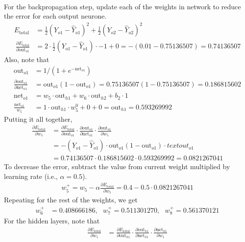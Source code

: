 \begin{example}
\begin{align}
\end{align}
For the backpropagation step, update each of the weights in network to reduce the error for each output neurone.
\begin{align}
E_{\text{total}} &= \frac{1}{2}(Y_{o1} - \hat{Y}_{o1})^2 + \frac{1}{2}(Y_{o2} - \hat{Y}_{o2})^2 \nonumber \\\
\frac{\partial E_{\text{total}}}{\partial \text{out}_{o1}} &= 2 \cdot \frac{1}{2}(Y_{o1} - \hat{Y}_{o1}) \cdot -1 + 0 = - (0.01 - 0.75136507) = 0.74136507 \nonumber
\end{align}
Also, note that
\begin{align}
\text{out}_{o1} &= 1/(1 + e^{-\text{net}_{o1}}) \nonumber \\
\frac{\partial\text{out}_{o1}}{\partial\text{net}_{o1}} &= \text{out}_{o1} (1 - \text{out}_{o1}) = 0.75136507(1-0.75136507) = 0.186815602 \nonumber \\
\text{net}_{o1} &= w_5 \cdot \text{out}_{h1} + w_6 \cdot \text{out}_{h2} + b_2 \cdot 1 \nonumber \\
\frac{\text{net}_{o1}}{w_5} &= 1 \cdot \text{out}_{h1} \cdot w_5^{0} + 0 + 0 = \text{out}_{h1} = 0.593269992 \nonumber
\end{align}
Putting it all together,
\begin{align}
\frac{\partial E_{\text{total}}}{\partial w_5} &= \frac{\partial E_{\text{total}}}{\partial \text{out}_{o1}} \cdot \frac{\partial \text{out}_{o1}}{ \partial \text{net}_{o1}} \cdot \frac{\partial \text{out}_{o1}}{\partial w_5} \nonumber \\
&= - (Y_{o1} - \hat{Y}_{o1}) \cdot \text{out}_{o1} (1 - \text{out}_{o1}) \cdot text{out}_{o1} \nonumber \\
&= 0.74136507 \cdot 0.186815602 \cdot 0.593269992 = 0.0821267041 \nonumber
\end{align}
To decrease the error, subtract the value from current weight multiplied by learning rate (i.e., $\alpha = 0.5$).
\begin{align}
w_5^+ = w_5 - \alpha \frac{\partial E_{\text{total}}}{\partial w_5} = 0.4 - 0.5 \cdot 0.0821267041 \nonumber 
\end{align}
Repeating for the rest of the weights, we get
\begin{align}
w_6^+ &= 0.408666186, \ \ \ w_7^+ = 0.511301270, \ \ \ w_8^+ = 0.561370121 \nonumber
\end{align}
For the hidden layers, note that
\begin{align}
\frac{\partial E_{\text{total}}}{\partial w_1} &= \frac{\partial E_{\text{total}}}{\partial \text{out}_{h1}} \cdot \frac{\partial \text{out}_{h1}}{\partial \text{net}_{h1}} \cdot \frac{\partial \text{net}_{h1}}{\partial w_1} \nonumber \\

\end{align}
\end{example}
